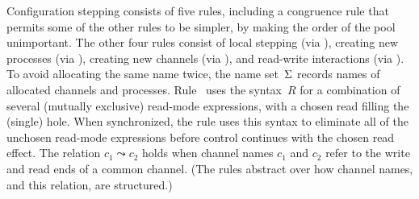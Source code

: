 Configuration stepping consists of five rules, including a congruence
rule  that permits some of the other rules to be simpler,
by making the order of the pool unimportant.
%
The other four rules consist of local stepping (via ),
creating new processes (via ),
creating new channels (via ),
and read-write interactions (via ).
%
To avoid allocating the same name twice, 
the name set~$\Sigma$ records names of allocated channels and processes.
%
Rule~ uses the syntax~$R$ for a combination of several (mutually exclusive) 
read-mode expressions, with a chosen read filling the (single) hole.
%
When synchronized, 
the rule uses this syntax to eliminate all of the unchosen read-mode expressions 
before control continues with the chosen read effect.
%
The relation $c_1 \leadsto c_2$ holds when 
channel names $c_1$ and $c_2$ refer to the 
write and read ends of a common channel.
%
(The rules abstract over how channel names, and this relation, are structured.)


